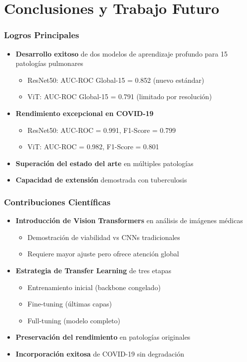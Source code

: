 
\section{Conclusiones y Trabajo Futuro}

\begin{frame}
\frametitle{Logros Principales}
\begin{itemize}
    \item \textbf{Desarrollo exitoso} de dos modelos de aprendizaje profundo para 15 patologías pulmonares
    \begin{itemize}
        \item ResNet50: AUC-ROC Global-15 = 0.852 (nuevo estándar)
        \item ViT: AUC-ROC Global-15 = 0.791 (limitado por resolución)
    \end{itemize}
    \item \textbf{Rendimiento excepcional en COVID-19}
    \begin{itemize}
        \item ResNet50: AUC-ROC = 0.991, F1-Score = 0.799
        \item ViT: AUC-ROC = 0.982, F1-Score = 0.801
    \end{itemize}
    \item \textbf{Superación del estado del arte} en múltiples patologías
    \item \textbf{Capacidad de extensión} demostrada con tuberculosis
\end{itemize}
\end{frame}

\begin{frame}
\frametitle{Contribuciones Científicas}
\begin{itemize}
    \item \textbf{Introducción de Vision Transformers} en análisis de imágenes médicas
    \begin{itemize}
        \item Demostración de viabilidad vs CNNs tradicionales
        \item Requiere mayor ajuste pero ofrece atención global
    \end{itemize}
    \item \textbf{Estrategia de Transfer Learning} de tres etapas
    \begin{itemize}
        \item Entrenamiento inicial (backbone congelado)
        \item Fine-tuning (últimas capas)
        \item Full-tuning (modelo completo)
    \end{itemize}
    \item \textbf{Preservación del rendimiento} en patologías originales
    \item \textbf{Incorporación exitosa} de COVID-19 sin degradación
\end{itemize}
\end{frame}

